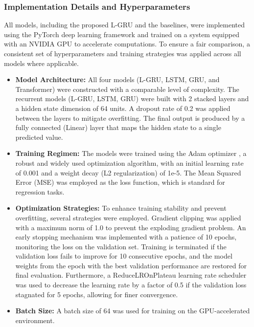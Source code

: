 \documentclass{cys}
\begin{document}
\begin{enumerate}
    
\subsubsection{Implementation Details and Hyperparameters}
    
    All models, including the proposed L-GRU and the baselines, were implemented using the PyTorch deep learning framework and trained on a system equipped with an NVIDIA GPU to accelerate computations. To ensure a fair comparison, a consistent set of hyperparameters and training strategies was applied across all models where applicable.
    \begin{itemize}
        \item \textbf{Model Architecture:}
        All four models (L-GRU, LSTM, GRU, and Transformer) were constructed with a comparable level of complexity. The recurrent models (L-GRU, LSTM, GRU) were built with 2 stacked layers and a hidden state dimension of 64 units. A dropout rate of 0.2 was applied between the layers to mitigate overfitting. The final output is produced by a fully connected (Linear) layer that maps the hidden state to a single predicted value.
        \item \textbf{Training Regimen:}
        The models were trained using the Adam optimizer \cite{kingma2014adam}, a robust and widely used optimization algorithm, with an initial learning rate of 0.001 and a weight decay (L2 regularization) of 1e-5. The Mean Squared Error (MSE) was employed as the loss function, which is standard for regression tasks.
        \item \textbf{Optimization Strategies:}
        To enhance training stability and prevent overfitting, several strategies were employed. Gradient clipping was applied with a maximum norm of 1.0 to prevent the exploding gradient problem. An early stopping mechanism was implemented with a patience of 10 epochs, monitoring the loss on the validation set. Training is terminated if the validation loss fails to improve for 10 consecutive epochs, and the model weights from the epoch with the best validation performance are restored for final evaluation. Furthermore, a ReduceLROnPlateau learning rate scheduler was used to decrease the learning rate by a factor of 0.5 if the validation loss stagnated for 5 epochs, allowing for finer convergence.
        \item \textbf{Batch Size:}
        A batch size of 64 was used for training on the GPU-accelerated environment.
    \end{itemize}



\end{enumerate}
\end{document}
